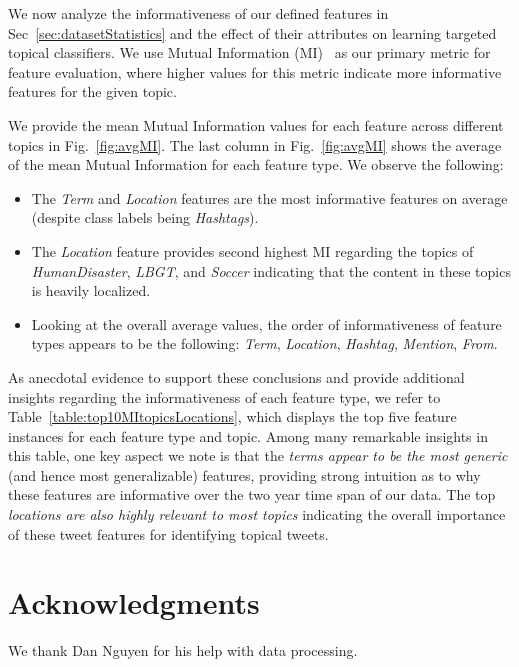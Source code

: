 \documentclass[letterpaper]{article}
\begin{document}
We now analyze the informativeness of our defined
features in Sec~\ref{sec:datasetStatistics} and the effect of their
attributes on learning targeted topical classifiers. 
We use Mutual Information (MI)~\cite{manning_ir} as our primary
metric for feature evaluation,   
where higher values for this metric indicate more informative features for the given topic.

We provide the mean Mutual Information
values for each feature across different topics in Fig.~\ref{fig:avgMI}.
The last column in Fig.~\ref{fig:avgMI} shows the
average of the mean Mutual Information for each feature type.  We observe
the following:
\begin{itemize}%
\item The \textit{Term} and \textit{Location} features are the most informative features on average (despite class labels being \emph{Hashtags}).
\item The \textit{Location} feature provides second highest MI regarding the topics of \textit{HumanDisaster}, \textit{LBGT}, and \textit{Soccer} indicating that the content in these topics is heavily localized.
\item Looking at the overall average values, the order of informativeness of feature types appears to be the following: \textit{Term}, \textit{Location}, \textit{Hashtag}, \textit{Mention}, \textit{From}.
\end{itemize}

As anecdotal evidence to support these conclusions and provide additional insights regarding
the informativeness of each feature type, we refer to
Table~\ref{table:top10MItopicsLocations}, which displays the top five feature instances
for each feature type and topic.  Among many remarkable insights in this table, one key aspect  
we note is that the \emph{terms appear to be the most generic} (and hence most generalizable) features,
providing strong intuition as to why these features are informative over the two year time
span of our data.  The top \emph{locations are also highly relevant to most topics} indicating
the overall importance of these tweet features for identifying topical tweets.

\section*{Acknowledgments}
We thank Dan Nguyen for his help with data processing.



\end{document}
